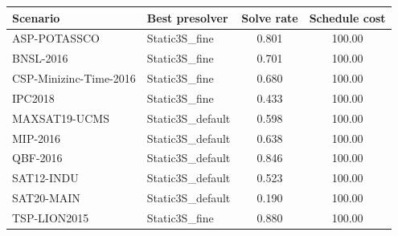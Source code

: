 \small
\begin{tabular}{llcc}
\toprule
Scenario & Best presolver & Solve rate & Schedule cost \\
\midrule
ASP-POTASSCO & Static3S\_fine & 0.801 & 100.00 \\
BNSL-2016 & Static3S\_fine & 0.701 & 100.00 \\
CSP-Minizinc-Time-2016 & Static3S\_fine & 0.680 & 100.00 \\
IPC2018 & Static3S\_fine & 0.433 & 100.00 \\
MAXSAT19-UCMS & Static3S\_default & 0.598 & 100.00 \\
MIP-2016 & Static3S\_default & 0.638 & 100.00 \\
QBF-2016 & Static3S\_default & 0.846 & 100.00 \\
SAT12-INDU & Static3S\_default & 0.523 & 100.00 \\
SAT20-MAIN & Static3S\_default & 0.190 & 100.00 \\
TSP-LION2015 & Static3S\_fine & 0.880 & 100.00 \\
\bottomrule
\end{tabular}
